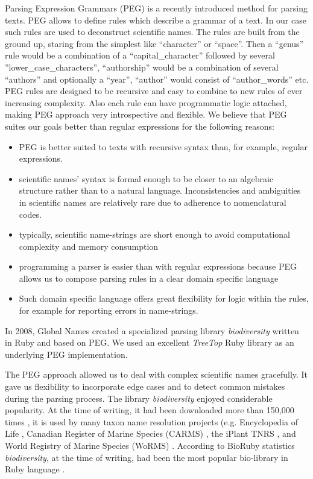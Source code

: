 \documentclass{bmcart}
\begin{document}
Parsing Expression Grammars (PEG) \cite{Ford2004} is a recently introduced
method for parsing texts. PEG allows to define rules which describe a grammar
of a text. In our case such rules are used to deconstruct scientific names.
The rules are built from the ground up, staring from the simplest like
``character'' or ``space''. Then a ``genus'' rule would be a combination of a
``capital\_character'' followed by several ''lower\_case\_characters'',
``authorship'' would be a combination of several ``authors'' and optionally a
``year'', ``author'' would consist of ``author\_words'' etc. PEG rules are
designed to be recursive and easy to combine to new rules of ever increasing
complexity. Also each rule can have programmatic logic attached, making PEG
approach very introspective and flexible. We believe that PEG suites our goals
better than regular expressions for the following reasons:

\begin{itemize}

  \item PEG is better suited to texts with recursive syntax than, for example,
    regular expressions.

  \item scientific names' syntax is formal enough to be closer to an algebraic
    structure rather than to a natural language. Inconsistencies and
    ambiguities in scientific names are relatively rare due to adherence to
    nomenclatural codes.

  \item typically, scientific name-strings are short enough to avoid
    computational complexity and memory consumption

  \item programming a parser is easier than with regular expressions because
    PEG allows us to compose parsing rules in a clear domain specific language

  \item Such domain specific language offers great flexibility for logic within
    the rules, for example for reporting errors in name-strings.

\end{itemize}

In 2008, Global Names created a specialized parsing library
\textit{biodiversity} \cite{biodiversity} written in Ruby and based on PEG. We
used an excellent \textit{TreeTop} Ruby library \cite{treetop} as an underlying
PEG implementation.

The PEG approach allowed us to deal with complex scientific names gracefully.
It gave us flexibility to incorporate edge cases and to detect common mistakes
during the parsing process. The library \textit{biodiversity} enjoyed
considerable popularity. At the time of writing, it had been downloaded more
than 150,000 times \cite{bdiv-downloads}, it is used by many taxon name
resolution projects (e.g. Encyclopedia of Life \cite{eol}, Canadian Register of
Marine Species (CARMS) \cite{carms}, the iPlant TNRS \cite{iplant}, and World
Registry of Marine Species (WoRMS) \cite{worms}.  According to BioRuby
statistics \textit{biodiversity}, at the time of writing, had been the most
popular bio-library in Ruby language \cite{biogems}.
\end{document}
